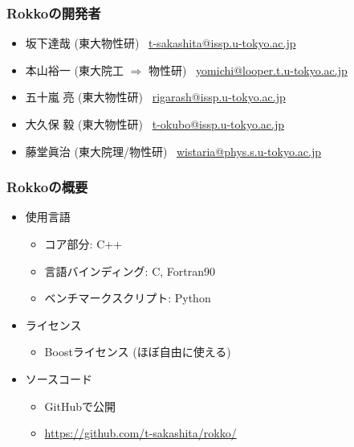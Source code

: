 \begin{frame}
  \frametitle{Rokkoの開発者}
  \begin{itemize}
    \setlength{\itemsep}{1em}
  \item 坂下達哉 (東大物性研) \ \href{mailto:t-sakashita@issp.u-tokyo.ac.jp}{t-sakashita@issp.u-tokyo.ac.jp}
  \item 本山裕一 (東大院工 $\Rightarrow $ 物性研) \ \href{mailto:yomichi@looper.u-tokyo.ac.jp}{yomichi@looper.t.u-tokyo.ac.jp}
  \item 五十嵐 亮 (東大物性研) \ \href{mailto:rigarash@issp.u-tokyo.ac.jp}{rigarash@issp.u-tokyo.ac.jp}
  \item 大久保 毅 (東大物性研) \ \href{mailto:t-okubo@issp.u-tokyo.ac.jp}{t-okubo@issp.u-tokyo.ac.jp}
  \item 藤堂眞治 (東大院理/物性研) \ \href{mailto:wistaria@phys.s.u-tokyo.ac.jp}{wistaria@phys.s.u-tokyo.ac.jp}
  \end{itemize}
\end{frame}

\begin{frame}
  \frametitle{Rokkoの概要}
  \begin{itemize}
  \item 使用言語
    \begin{itemize}
    \item コア部分: C++
    \item 言語バインディング: C, Fortran90
    \item ベンチマークスクリプト: Python
    \end{itemize}
  \item ライセンス
    \begin{itemize}
    \item Boostライセンス (ほぼ自由に使える)
    \end{itemize}
  \item ソースコード
    \begin{itemize}
    \item GitHubで公開
    \item \url{https://github.com/t-sakashita/rokko/}
    \end{itemize}
  \end{itemize}
\end{frame}

